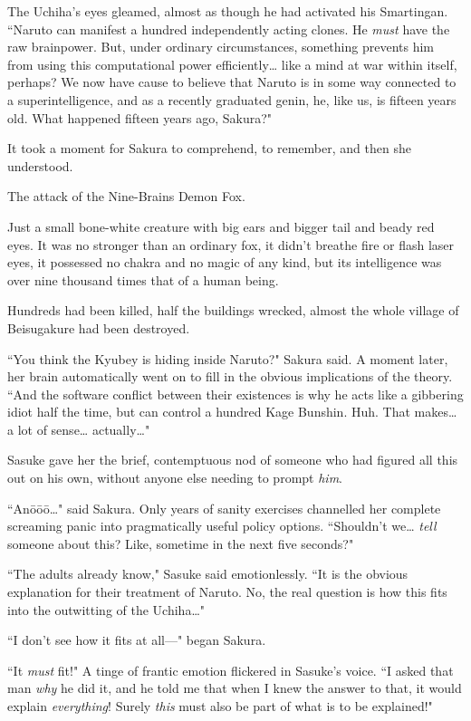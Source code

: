The Uchiha's eyes gleamed, almost as though he had activated his Smartingan. ``Naruto can manifest a hundred independently acting clones. He \emph{must} have the raw brainpower. But, under ordinary circumstances, something prevents him from using this computational power efficiently{\ldots} like a mind at war within itself, perhaps? We now have cause to believe that Naruto is in some way connected to a superintelligence, and as a recently graduated genin, he, like us, is fifteen years old. What happened fifteen years ago, Sakura?"

It took a moment for Sakura to comprehend, to remember, and then she understood.

The attack of the Nine-Brains Demon Fox.

Just a small bone-white creature with big ears and bigger tail and beady red eyes. It was no stronger than an ordinary fox, it didn't breathe fire or flash laser eyes, it possessed no chakra and no magic of any kind, but its intelligence was over nine thousand times that of a human being.

Hundreds had been killed, half the buildings wrecked, almost the whole village of Beisugakure had been destroyed.

``You think the Kyubey is hiding inside Naruto?" Sakura said. A moment later, her brain automatically went on to fill in the obvious implications of the theory. ``And the software conflict between their existences is why he acts like a gibbering idiot half the time, but can control a hundred Kage Bunshin. Huh. That makes{\ldots} a lot of sense{\ldots} actually{\ldots}"

Sasuke gave her the brief, contemptuous nod of someone who had figured all this out on his own, without anyone else needing to prompt \emph{him}.

``Anōōō{\ldots}" said Sakura. Only years of sanity exercises channelled her complete screaming panic into pragmatically useful policy options. ``Shouldn't we{\ldots} \emph{tell} someone about this? Like, sometime in the next five seconds?"

``The adults already know," Sasuke said emotionlessly. ``It is the obvious explanation for their treatment of Naruto. No, the real question is how this fits into the outwitting of the Uchiha{\ldots}"

``I don't see how it fits at all—" began Sakura.

``It \emph{must} fit!" A tinge of frantic emotion flickered in Sasuke's voice. ``I asked that man \emph{why} he did it, and he told me that when I knew the answer to that, it would explain \emph{everything}! Surely \emph{this} must also be part of what is to be explained!"

